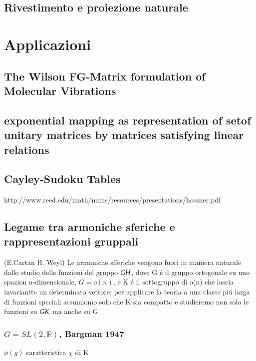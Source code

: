 \documentclass[oneside,12pt]{memoir}
\begin{document}
\section{Rivestimento e proiezione naturale}

\chapter{Applicazioni}
\PartialToc


\section{The Wilson FG-Matrix formulation of Molecular Vibrations}
\section{exponential mapping as representation of setof unitary matrices by matrices satisfying linear relations}

\section{Cayley-Sudoku Tables}
http://www.reed.edu/math/nums/resources/presentations/hossner.pdf

\section{Legame tra armoniche sferiche e rappresentazioni gruppali}
(E.Cartan H. Weyl) Le armaniche sfferiche vengono fuori in maniera naturale dallo studio delle funzioni del gruppo $G\\H$, dove G \'e il gruppo ortogonale su uno spazion n-dimensionale, $G=o(n)$, e K \'e il sottogruppo di o(n) che lascia invariantte un determinato vettore; per applicare la teoria a una classe pi\'u larga di funzioni speciali assumiomo solo che K sia compatto e studieremo non solo le funzioni su $G\\K$ ma anche su G.

\subsection{\texorpdfstring{$G=SL(2,\mathbb{R})$}{G=SL(2,R)}, Bargman 1947}
$\phi(g)$ caratteristica $\chi$ di K
\end{document}
